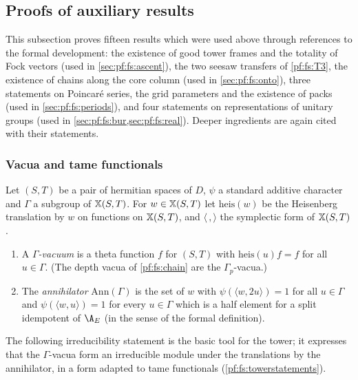 \subsection{Proofs of auxiliary results}\label{sec:pf:fs:aux}

This subsection proves fifteen results which were used above through references to the formal development: the existence of
good tower frames and the totality of Fock vectors (used in \cref{sec:pf:fs:ascent}), the two seesaw transfers of
\ref{pf:fs:T3}, the existence of chains along the core column (used in \cref{sec:pf:fs:onto}), three statements on Poincar\'e
series, the grid parameters and the existence of packs (used in \cref{sec:pf:fs:periods}), and four statements on
representations of unitary groups (used in \cref{sec:pf:fs:bur,sec:pf:fs:real}). Deeper ingredients are again cited with their
statements.

\subsubsection{Vacua and tame functionals}

\begin{definition}\label{pf:fs:vacua}
Let $(S,T)$ be a pair of hermitian spaces of $D$, $\psi$ a standard additive character and $\Gamma$ a subgroup of
$\mathbb X(S,T)$. For $w\in\mathbb X(S,T)$ let $\mathrm{heis}(w)$ be the Heisenberg translation by $w$ on functions on $\mathbb X(S,T)$, and
$\langle\,,\rangle$ the symplectic form of $\mathbb X(S,T)$.
\begin{enumerate}[label=(\alph*)]
\item A \emph{$\Gamma$-vacuum} is a theta function $f$ for $(S,T)$ with $\mathrm{heis}(u)f=f$ for all $u\in\Gamma$. (The depth vacua of
\cref{pf:fs:chain} are the $\Gamma_p$-vacua.)
\item The \emph{annihilator} $\mathrm{Ann}(\Gamma)$ is the set of $w$ with $\psi(\langle w,2u\rangle)=1$ for all $u\in\Gamma$ and
$\psi(\langle w,u\rangle)=1$ for every $u\in\Gamma$ which is a half element for a split idempotent of $\A_E$ (in the sense of the
formal definition).
\end{enumerate}
\end{definition}

The following irreducibility statement is the basic tool for the tower; it expresses that the $\Gamma$-vacua form an irreducible
module under the translations by the annihilator, in a form adapted to tame functionals (\cref{pf:fs:towerstatements}).

